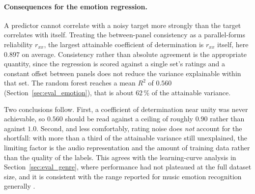 \paragraph{Consequences for the emotion regression.}
A predictor cannot correlate with a noisy target more strongly than the target correlates
with itself. Treating the between-panel consistency as a parallel-forms reliability
$r_{xx}$, the largest attainable coefficient of determination is $r_{xx}$ itself, here
$0.897$ on average. Consistency rather than absolute agreement is the appropriate
quantity, since the regression is scored against a single set's ratings and a constant
offset between panels does not reduce the variance explainable within that set. The random
forest reaches a mean $R^2$ of $0.560$ (Section~\ref{sec:eval_emotion}), that is
about $62\,\%$ of the attainable variance.

Two conclusions follow. First, a coefficient of determination near unity was never
achievable, so $0.560$ should be read against a ceiling of roughly $0.90$ rather than
against $1.0$. Second, and less comfortably, rating noise does \emph{not} account for the
shortfall: with more than a third of the attainable variance still unexplained, the
limiting factor is the audio representation and the amount of training data rather than
the quality of the labels. This agrees with the learning-curve analysis in
Section~\ref{sec:eval_genre}, where performance had not plateaued at the full
dataset size, and it is consistent with the range reported for music emotion recognition
generally \citep{kang2025there}.
